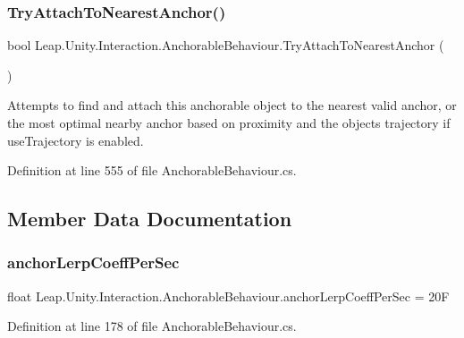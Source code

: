 \subsubsection{\texorpdfstring{TryAttachToNearestAnchor()}{TryAttachToNearestAnchor()}}
{\footnotesize\ttfamily bool Leap.\+Unity.\+Interaction.\+Anchorable\+Behaviour.\+Try\+Attach\+To\+Nearest\+Anchor (\begin{DoxyParamCaption}{ }\end{DoxyParamCaption})}



Attempts to find and attach this anchorable object to the nearest valid anchor, or the most optimal nearby anchor based on proximity and the object\textquotesingle{}s trajectory if use\+Trajectory is enabled. 



Definition at line 555 of file Anchorable\+Behaviour.\+cs.



\subsection{Member Data Documentation}
\mbox{\label{class_leap_1_1_unity_1_1_interaction_1_1_anchorable_behaviour_a4f5df5a27d79d1ffcbbcdfb80da57274}} 
\subsubsection{\texorpdfstring{anchorLerpCoeffPerSec}{anchorLerpCoeffPerSec}}
{\footnotesize\ttfamily float Leap.\+Unity.\+Interaction.\+Anchorable\+Behaviour.\+anchor\+Lerp\+Coeff\+Per\+Sec = 20F}



Definition at line 178 of file Anchorable\+Behaviour.\+cs.

\mbox{\label{class_leap_1_1_unity_1_1_interaction_1_1_anchorable_behaviour_a6e8db2d74a39b3647c7019c1c7ee92d5}} 
